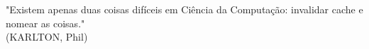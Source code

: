 
\begin{flushright}
\begin{minipage}{0.5\textwidth}

\vspace{15.0cm} %

"Existem apenas duas coisas difíceis em Ciência da Computação: invalidar cache e nomear as coisas." \\
(KARLTON, Phil)

\end{minipage}
\end{flushright}


